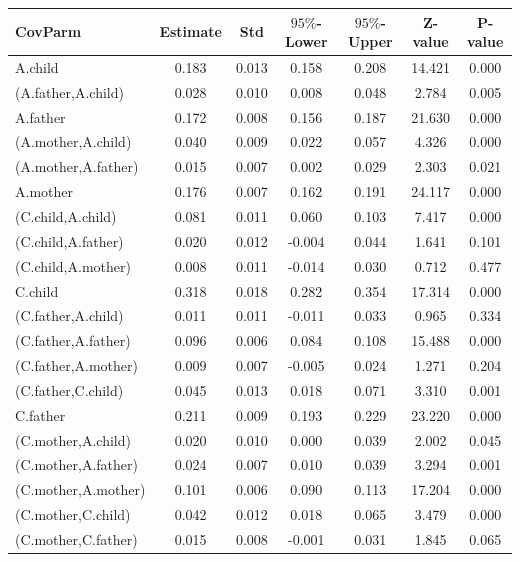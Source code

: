 \documentclass[11pt,a5paper,twoside]{book}
\begin{document}
{\scriptsize{
\begin{center}
\setlength\LTleft{0pt}
\setlength\LTright{0pt}
\begin{longtable}{@{\extracolsep{\fill}}lcccccc@{}}
  \hline
CovParm & Estimate & Std & $95\%$-Lower & $95\%$-Upper & Z-value & P-value \\ 
  \hline
 A.child  & 0.183 & 0.013 & 0.158 & 0.208 & 14.421 & 0.000 \\ 
   (A.father,A.child)  & 0.028 & 0.010 & 0.008 & 0.048 & 2.784 & 0.005 \\ 
   A.father  & 0.172 & 0.008 & 0.156 & 0.187 & 21.630 & 0.000 \\ 
   (A.mother,A.child)  & 0.040 & 0.009 & 0.022 & 0.057 & 4.326 & 0.000 \\ 
   (A.mother,A.father)  & 0.015 & 0.007 & 0.002 & 0.029 & 2.303 & 0.021 \\ 
   A.mother  & 0.176 & 0.007 & 0.162 & 0.191 & 24.117 & 0.000 \\ 
   (C.child,A.child)  & 0.081 & 0.011 & 0.060 & 0.103 & 7.417 & 0.000 \\ 
   (C.child,A.father)  & 0.020 & 0.012 & -0.004 & 0.044 & 1.641 & 0.101 \\ 
   (C.child,A.mother)  & 0.008 & 0.011 & -0.014 & 0.030 & 0.712 & 0.477 \\ 
   C.child  & 0.318 & 0.018 & 0.282 & 0.354 & 17.314 & 0.000 \\ 
   (C.father,A.child)  & 0.011 & 0.011 & -0.011 & 0.033 & 0.965 & 0.334 \\ 
   (C.father,A.father)  & 0.096 & 0.006 & 0.084 & 0.108 & 15.488 & 0.000 \\ 
   (C.father,A.mother)  & 0.009 & 0.007 & -0.005 & 0.024 & 1.271 & 0.204 \\ 
   (C.father,C.child)  & 0.045 & 0.013 & 0.018 & 0.071 & 3.310 & 0.001 \\ 
   C.father  & 0.211 & 0.009 & 0.193 & 0.229 & 23.220 & 0.000 \\ 
   (C.mother,A.child)  & 0.020 & 0.010 & 0.000 & 0.039 & 2.002 & 0.045 \\ 
   (C.mother,A.father)  & 0.024 & 0.007 & 0.010 & 0.039 & 3.294 & 0.001 \\ 
   (C.mother,A.mother)  & 0.101 & 0.006 & 0.090 & 0.113 & 17.204 & 0.000 \\ 
   (C.mother,C.child)  & 0.042 & 0.012 & 0.018 & 0.065 & 3.479 & 0.000 \\ 
   (C.mother,C.father)  & 0.015 & 0.008 & -0.001 & 0.031 & 1.845 & 0.065 \\ 

\end{longtable}
\end{center}}}
\end{document}
